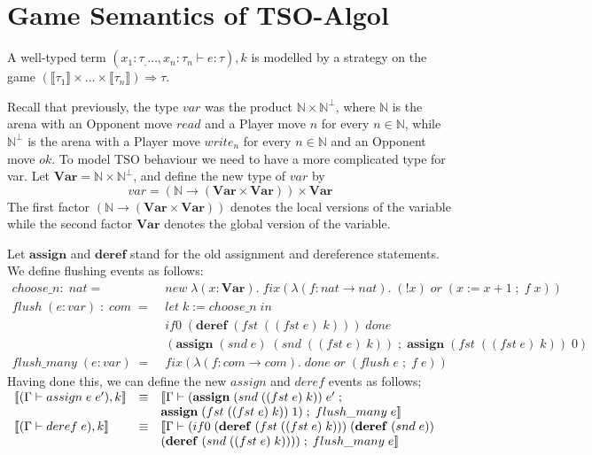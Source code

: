 \documentclass{article}
\begin{document}
\section{Game Semantics of TSO-Algol}
A well-typed term $(x_1 : \tau_,\ldots, x_n : \tau_n \vdash e : \tau), k$ is
modelled by a strategy on the game $(\llbracket \tau_1 \rrbracket \times
\ldots \times \llbracket \tau_n \rrbracket) \Rightarrow \tau$.

Recall that previously, the type $var$ was the product $\mathbb{N} \times
\mathbb{N}^{\bot}$, where $\mathbb{N}$ is the arena with an Opponent move $read$
and a Player move $n$ for every $n \in \mathbb{N}$, while $\mathbb{N}^{\bot}$ is
the arena with a Player move $write_n$ for every $n \in \mathbb{N}$ and an
Opponent move $ok$. To model TSO behaviour we need to have a more complicated
type for var. Let $\mathbf{Var} = \mathbb{N} \times
\mathbb{N}^{\bot}$, and define the new type of $var$ by
$$var = (\mathbb{N} \longrightarrow (\mathbf{Var} \times \mathbf{Var})) \times
\mathbf{Var}$$
The first factor $(\mathbb{N} \longrightarrow (\mathbf{Var} \times
\mathbf{Var}))$ denotes the local versions of the variable while the second factor
$\mathbf{Var}$ denotes the global version of the variable.

Let $\mathbf{assign}$ and $\mathbf{deref}$ stand for the old assignment and
dereference statements. We define flushing events as follows:
\begin{align*}
choose\_n : \; nat = \; &new \; \lambda (x:\mathbf{Var}). \;
fix(\lambda(f:nat\rightarrow nat).\; (!x) \; or \; (x:=x+1 \; ; \; f \; x))\\
flush \; (e:var) \; : \; com \; = \; &let \; k := choose\_n \; in \\
&if0 \; (\mathbf{deref} \;(fst \; ((fst \; e) \; k))) \; done \; \\
&(\mathbf{assign} \; (snd \; e) \; (snd \; ((fst \; e) \; k)) \; ; \;
\mathbf{assign} \; (fst \; ((fst \; e) \; k)) \; 0)\\
flush\_many \; (e:var) \; = \; &fix(\lambda(f:com\rightarrow com).\; done \; or
\; (flush \; e \; ; \; f \; e))
\end{align*}
Having done this, we can define the new $assign$ and $deref$ events as follows;
$\begin{array}{l l l}
\llbracket (\Gamma \vdash assign \; e \; e'), k \rrbracket &\equiv
& \llbracket \Gamma \vdash (\mathbf{assign} \; (snd \; ((fst \; e) \; k)) \;
e' \; ; \;\\
& & \mathbf{assign} \; (fst \; ((fst \; e) \; k)) \; 1) \; ; \; flush\_many \; e
\rrbracket\\
\llbracket (\Gamma \vdash deref \; e), k \rrbracket &\equiv
&\llbracket \Gamma \vdash (if0 \; (\mathbf{deref} \; (fst \; ((fst \; e) \; k)))
\; (\mathbf{deref} \; (snd \; e)) \\
& &(\mathbf{deref} \; (snd \; ((fst \; e) \; k)))) \; ; \; flush\_many \; e
\rrbracket
\end{array}$
\end{document}
